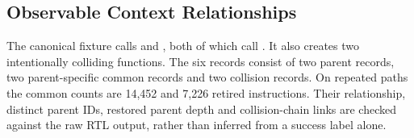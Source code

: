 \subsection{Observable Context Relationships}
The canonical fixture calls  and , both of which call . It also creates two intentionally colliding functions. The six records consist of two parent records, two parent-specific common records and two collision records. On repeated paths the common counts are 14,452 and 7,226 retired instructions. Their relationship, distinct parent IDs, restored parent depth and collision-chain links are checked against the raw RTL output, rather than inferred from a success label alone.
